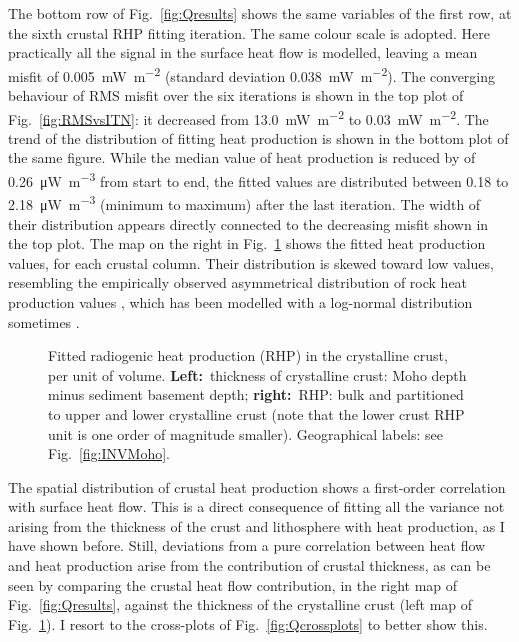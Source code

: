 The bottom row of Fig.~\ref{fig:Qresults} shows the same variables of the first row, at the sixth crustal RHP fitting iteration.
The same colour scale is adopted.
Here practically all the signal in the surface heat flow is modelled, leaving a mean misfit of 0.005~\si{\milli \watt \per \square \metre} (standard deviation 0.038~\si{\milli \watt \per \square \metre}).
The converging behaviour of RMS misfit over the six iterations is shown in the top plot of Fig.~\ref{fig:RMSvsITN}: it decreased from 13.0~\si{\milli \watt \per \square \metre} to 0.03~\si{\milli \watt \per \square \metre}.
The trend of the distribution of fitting heat production is shown in the bottom plot of the same figure.
While the median value of heat production is reduced by of \SI{0.26}{\micro \watt \per \cubic \metre} from start to end, the fitted values are distributed between \num{0.18} to \SI{2.18}{\micro \watt \per \cubic \metre} (minimum to maximum) after the last iteration.
The width of their distribution appears directly connected to the decreasing misfit shown in the top plot.
The map on the right in Fig.~\ref{fig:Aresults} shows the fitted heat production values, for each crustal column.
Their distribution is skewed toward low values, resembling the empirically observed asymmetrical distribution of rock heat production values \parencites{Vila2010}{Artemieva2017granite}{Hasterok2017_ign}, which has been modelled with a log-normal distribution sometimes \parencites[e.g. ][]{Jokinen1999}{Huang2013}.

\begin{figure}
	\begin{adjustbox}{center}
	\end{adjustbox}
	\caption[Fitted radiogenic heat production (RHP) in the crystalline crust, per unit of volume.]{Fitted radiogenic heat production (RHP) in the crystalline crust, per unit of volume. \textbf{Left:}~thickness of crystalline crust: Moho depth minus sediment basement depth; \textbf{right:}~RHP: bulk and partitioned to upper and lower crystalline crust (note that the lower crust RHP unit is one order of magnitude smaller). Geographical labels: see Fig.~\ref{fig:INVMoho}.}
	\label{fig:Aresults}
\end{figure}

The spatial distribution of crustal heat production shows a first-order correlation with surface heat flow.
This is a direct consequence of fitting all the variance not arising from the thickness of the crust and lithosphere with heat production, as I have shown before.
Still, deviations from a pure correlation between heat flow and heat production arise from the contribution of crustal thickness, as can be seen by comparing the crustal heat flow contribution, in the right map of Fig.~\ref{fig:Qresults}, against the thickness of the crystalline crust (left map of Fig.~\ref{fig:Aresults}).
I resort to the cross-plots of Fig.~\ref{fig:Qcrossplots} to better show this.

